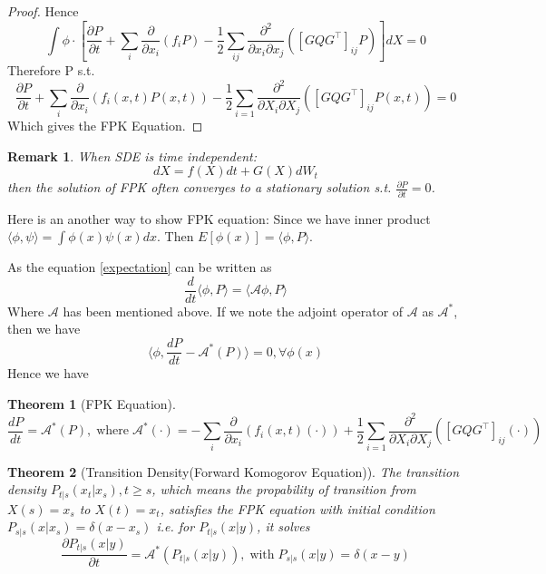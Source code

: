 \documentclass{ctexart}
\newtheorem{theorem}{Theorem}
\newtheorem{remark}{Remark}
\begin{document}
\begin{proof}
    Hence $$\int \phi \cdot\left[\frac{\partial P}{\partial t}+\sum_{i} \frac{\partial}{\partial x_{i}}\left(f_{i} P\right)-\frac{1}{2} \sum_{i j} \frac{\partial^{2}}{\partial x_{i} \partial x_{j}}\left(\left[G Q G^{\top}\right]_{i j} P\right)\right] d X=0$$
    Therefore P s.t.    
    \begin{equation}
        \frac{\partial P}{\partial t}+\sum_{i} \frac{\partial}{\partial x_{i}}\left(f_{i}(x, t) P(x, t)\right)-\frac{1}{2} \sum_{i=1} \frac{\partial^{2}}{\partial X_{i} \partial X_{j}}\left(\left[G Q G^{\top}\right]_{i j} P\left(x,t\right)\right)=0
    \end{equation}
    Which gives the FPK Equation.
\end{proof}

\begin{remark}
    When SDE is time independent:  
    \begin{equation}
        d X=f(X) d t+G(X) d W_{t}  
    \end{equation}
    then the solution of FPK often converges to a stationary solution s.t.  $\frac{\partial P}{\partial t}=0$.
\end{remark}
Here is an another way to show FPK equation: Since we have inner product $\langle\phi, \psi\rangle=\int \phi(x)\psi(x)dx$. Then $E[\phi(x)]=\langle\phi, P\rangle$.

As the equation \ref{expectation} can be written as 
\begin{equation}
    \frac{d}{dt}\langle\phi, P\rangle=\langle\mathcal{A}\phi, P\rangle
\end{equation}
Where $\mathcal{A}$ has been mentioned above. If we note the adjoint operator of $\mathcal{A}$ as $\mathcal{A}^*$, then we have
\begin{equation}
    \langle\phi, \frac{dP}{dt}-\mathcal{A}^*(P)\rangle=0,\forall \phi(x)
\end{equation}
Hence we have 
\begin{theorem}[FPK Equation]
    \begin{equation}
    \frac{dP}{dt}=\mathcal{A}^*(P),\operatorname{where} \mathcal{A}^*(\cdot)=-\sum_{i} \frac{\partial}{\partial x_{i}}\left(f_{i}(x, t) (\cdot)\right)+\frac{1}{2} \sum_{i=1} \frac{\partial^{2}}{\partial X_{i} \partial X_{j}}\left(\left[G Q G^{\top}\right]_{i j}(\cdot)\right)
\end{equation}
\end{theorem}

\begin{theorem}[Transition Density(Forward Komogorov Equation)]
     The transition density $P_{t|s}(x_t|x_s),t\geq s$, which means the propability of transition from $X(s)=x_s$ to $X(t)=x_t$, satisfies the FPK equation with initial condition $P_{s|s}(x|x_s)=\delta(x-x_s)$
     i.e. for $P_{t|s}(x|y)$, it solves
     \begin{equation}
        \frac{\partial P_{t|s}(x|y)}{\partial t}=\mathcal{A}^*(P_{t|s}(x|y)), \operatorname{with} P_{s|s}(x|y)=\delta(x-y)
     \end{equation}
\end{theorem}
\end{document}
